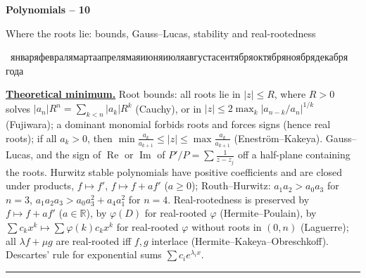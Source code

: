 \documentclass[11pt,a4paper]{article}
\newcommand{\head}[1]{\par\medskip\noindent\textbf{\underline{#1}}\quad}
\newcommand{\rudate}{\number\day~\ifcase\month\or января\or февраля\or марта\or апреля\or мая\or июня\or июля\or августа\or сентября\or октября\or ноября\or декабря\fi~\number\year~года}
\newcommand{\sheettitle}[3]{%
  \begin{center}
  {\huge\bfseries #1\par}\vspace{1.2em}
  {\Large #2\par}\vspace{0.8em}
  \if\relax\detokenize{#3}\relax\else{\Large #3\par}\vspace{0.8em}\fi
  {\foreignlanguage{russian}{\rudate}\par}
  \end{center}\vspace{0.5em}}
\begin{document}
\sheettitle{Polynomials -- 10}{Where the roots lie: bounds, Gauss--Lucas, stability and real-rootedness}{Homework}

\head{Theoretical minimum.} Root bounds: all roots lie in $|z|\le R$, where $R>0$ solves
$|a_n|R^n=\sum_{k<n}|a_k|R^k$ (Cauchy), or in $|z|\le2\max_k|a_{n-k}/a_n|^{1/k}$ (Fujiwara); a
dominant monomial forbids roots and forces signs (hence real roots); if all $a_k>0$, then
$\min\frac{a_k}{a_{k+1}}\le|z|\le\max\frac{a_k}{a_{k+1}}$ (Enestr\"om--Kakeya). Gauss--Lucas, and the
sign of $\operatorname{Re}$ or $\operatorname{Im}$ of $P'/P=\sum\frac1{z-z_j}$ off a half-plane
containing the roots. Hurwitz stable polynomials have positive coefficients and are closed under
products, $f\mapsto f'$, $f\mapsto f+af'$ ($a\ge0$); Routh--Hurwitz: $a_1a_2>a_0a_3$ for $n=3$,
$a_1a_2a_3>a_0a_3^2+a_4a_1^2$ for $n=4$. Real-rootedness is preserved by $f\mapsto f+af'$
($a\in\mathbb{R}$), by $\varphi(D)$ for real-rooted $\varphi$ (Hermite--Poulain), by
$\sum c_kx^k\mapsto\sum\varphi(k)c_kx^k$ for real-rooted $\varphi$ without roots in $(0,n)$
(Laguerre); all $\lambda f+\mu g$ are real-rooted iff $f,g$ interlace (Hermite--Kakeya--Obreschkoff).
Descartes' rule for exponential sums $\sum c_ie^{\lambda_ix}$.

\medskip\noindent\rule{\linewidth}{0.4pt}
\end{document}
